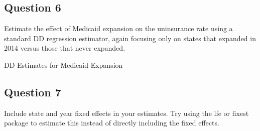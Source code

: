 \documentclass[
]{article}
\begin{document}
\subsection{Question 6}\label{question-6}

Estimate the effect of Medicaid expansion on the uninsurance rate using
a standard DD regression estimator, again focusing only on states that
expanded in 2014 versus those that never expanded.

\begin{table}

\caption{\label{tbl-ddregs}DD Estimates for Medicaid Expansion}


\end{table}%

\subsection{Question 7}\label{question-7}

Include state and year fixed effects in your estimates. Try using the
lfe or fixest package to estimate this instead of directly including the
fixed effects.
\end{document}
